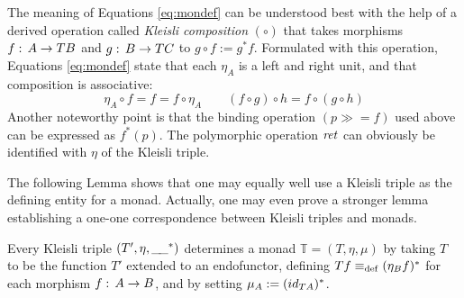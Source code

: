 The meaning of Equations \eqref{eq:mondef} can be understood best with the help
of a derived operation called \emph{Kleisli composition} $(\circ)$ that takes
morphisms $f :\, A \to TB$ and $g :\, B \to TC$ to $g \circ f := g^*f$. Formulated
with this operation, Equations \eqref{eq:mondef} state that each $\eta_A$ is a left
and right unit, and that composition is associative:
\begin{equation}
  \label{eq:kleislicomp}
  \eta_A\circ f = f = f \circ \eta_A \qquad (f \circ g) \circ h = f \circ (g \circ h)
\end{equation}
Another noteworthy point is that the binding operation $(p \gg= f)$ used above
can be expressed as $f^*(p)$. The polymorphic operation $\mathit{ret}$ can obviously
be identified with $\eta$ of the Kleisli triple.

The following Lemma shows that one may equally well use a Kleisli triple as the
defining entity for a monad. Actually, one may even prove a stronger lemma
establishing a one-one correspondence between Kleisli triples and monads.
\begin{lem}
  Every Kleisli triple $(T', \eta, \_\!\_^*)$ determines a monad $\mathbb{T} = (T,
  \eta, \mu)$ by taking $T$ to be the function $T'$ extended to an endofunctor,
  defining $T f \equiv_{\mathrm{def}} (\eta_B f)^*$ for each morphism $f :\, A \to B$, and by setting
  $\mu_A := ({id}_{T A})^*$.
\end{lem}
